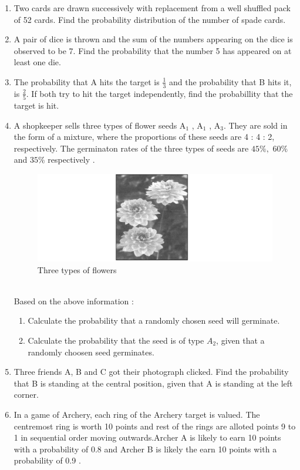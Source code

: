 \begin{enumerate}[label=\thesection.\arabic*.,ref=\thesection.\theenumi]
\begin{enumerate}
\end{enumerate}
\item Two cards are drawn successively with replacement from a well shuffled pack of 52 cards. Find the probability distribution of the number of spade cards.
\item A pair of dice is thrown and the sum of the numbers appearing on the dice is observed to be 7. Find the probability that the number 5 has appeared on at least one die.
\item The probability that A hits the target is $\frac{1}{3}$ and the probability that B hits it, is $\frac{2}{5}.$ If both try to hit the target independently, find the probabillity that the target is hit. 
\item A shopkeeper sells three types of flower seeds A$_1$ , A$_1$ , A$_3$. They are sold in the form of a mixture, where the proportions of these seeds are  4 : 4 : 2, respectively. The germinaton rates of the three types of seeds are $45\%,$ $60\%$ and $35\%$ respectively .
\begin{figure}[!ht]
\centering                                  \includegraphics[width=\columnwidth]{figs/flowers}                                     
\caption{Three types of flowers}            
\label{fig:flowers11}                       
\end{figure}
\\ Based on  the above information :
\begin{enumerate}
\item  Calculate the probability that a randomly chosen seed will germinate.
\item  Calculate the probability  that the seed is of type $A_2$, given that a randomly choosen seed germinates.
\end{enumerate}
\item Three friends A, B and C got their photograph clicked. Find the probability that B is standing at the central position, given that A is standing at the left corner.
\item In a game of Archery, each ring of the Archery target is valued. The centremost ring is worth 10 points and rest of the rings are alloted points 9 to 1 in sequential order moving outwards.Archer A is likely to earn 10 points with a probability of 0.8 and Archer B is likely the earn 10 points with a probability of 0.9 .

\end{enumerate}

